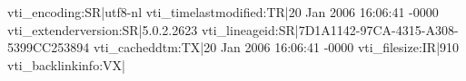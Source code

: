 vti_encoding:SR|utf8-nl
vti_timelastmodified:TR|20 Jan 2006 16:06:41 -0000
vti_extenderversion:SR|5.0.2.2623
vti_lineageid:SR|{7D1A1142-97CA-4315-A308-5399CC253894}
vti_cacheddtm:TX|20 Jan 2006 16:06:41 -0000
vti_filesize:IR|910
vti_backlinkinfo:VX|
